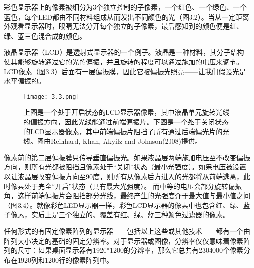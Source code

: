 \documentclass[lang=cn,12pt,marginpar=margintrue]{elegantbook}
\begin{document}

彩色显示器上的像素被细分为3个独立控制的子像素，一个红色、一个绿色、一个蓝色，每个LED都由不同材料组成从而发出不同颜色的光（图3.2）。当从一定距离外观看显示器时，眼睛无法分开每个独立的子像素，最后感知到的颜色便是红、绿、蓝三色混合成的颜色。

液晶显示器（LCD）是透射式显示器的一个例子。液晶是一种材料，其分子结构使其能够旋转通过它的光的偏振，并且旋转的程度可以通过施加的电压来调节。LCD像素（图3.3）后面有一层偏振膜，因此它被偏振光照亮——让我们假设光是水平偏振的。

\begin{figure}[htb]
  \centering
  \texttt{[image: 3.3.png]}
  \caption{上图是一个处于开启状态的LCD显示器像素，其中液晶单元旋转光线的偏振方向，因此光线能通过前端偏振片。下图是一个处于关闭状态的LCD显示器像素，其中前端偏振片阻挡了所有通过后端偏光片的光线。图由Reinhard, Khan, Akyilz and Johnson(2008)提供。}
\end{figure}


像素前的第二层偏振膜只传导垂直偏振光。如果液晶层两端施加电压至不改变偏振方向，则所有光都被阻挡且像素处于“关闭”状态（最小光强度）。如果电压被设置以让液晶层改变偏振方向至90度，则所有从像素后方进入的光都将从前端逃离，此时像素处于完全“开启”状态（具有最大光强度）。 而中等的电压会部分旋转偏振角，这样前端偏振片会阻挡部分光线，最终产生的光强度介于最大值与最小值之间（图3.4）。就像彩色LED显示器一样，彩色LCD显示器的像素中也包含红、绿、蓝子像素，实质上是三个独立的、覆盖有红、绿、蓝三种颜色过滤器的像素。


任何形式的有固定像素阵列的显示器——包括以上这些或其他技术——都有一个由阵列大小决定的基础的固定分辨率。对于显示器或图像，分辨率仅仅意味着像素阵列的尺寸：如果桌面显示器有1920*1200的分辨率，那么它总共有2304000个像素分布在1920列和1200行的像素阵列中。
\end{document}
